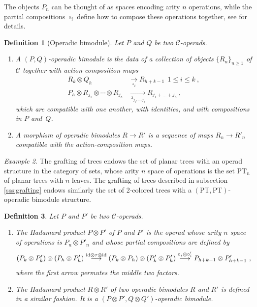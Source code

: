\documentclass[twoside, 12pt]{amsart}
\newtheorem{definition}{Definition}[section]
\theoremstyle{remark}
\newtheorem{example}[definition]{\sc Example}
\begin{document}
The objects $P_n$ can be thought of as spaces encoding arity $n$ operations, while the partial compositions $\circ_i$ define how to compose these operations together, see \cite[Chapter 5]{LodayVallette12} for details. 

\begin{definition}[Operadic bimodule] Let $P$ and $Q$ be two $\mathcal{C}$-operads.
\begin{enumerate}[leftmargin=*]
\item A \emph{$(P,Q)$-operadic bimodule} is the data of a collection of objects $\{ R_n \}_{n \geqslant 1}$ of $\mathcal{C}$ together with \emph{action-composition maps}
\begin{align*}
R_k \otimes Q_h &\underset{\circ_i}{\longrightarrow} R_{h+k-1} \ \ 1 \leqslant i \leqslant k \ ,  \\
P_h \otimes R_{j_1} \otimes \cdots \otimes R_{j_h} &\underset{\lambda_{j_1,\dots,j_h}}{\longrightarrow} R_{j_1 + \dots + j_h} \ ,
\end{align*}
which are compatible with one another, with identities, and with compositions in $P$ and~$Q$. 
\item A \emph{morphism of operadic bimodules} $R \rightarrow R'$ is a sequence of maps $R_n \rightarrow R'_n$ compatible with the action-composition maps.
\end{enumerate}
\end{definition}

\begin{example}
The grafting of trees endows the set of planar trees with an operad structure in the category of sets, whose arity $n$ space of operations is the set $\mathrm{PT}_n$ of planar trees with $n$ leaves. 
The grafting of trees described in subsection \ref{sss:grafting} endows similarly the set of 2-colored trees with a $(\mathrm{PT},\mathrm{PT})$-operadic bimodule structure. 
\end{example}

\begin{definition} \label{def:hadamard-product} Let $P$ and $P'$ be two $\mathcal{C}$-operads.
\begin{enumerate}[leftmargin=*]
    \item The \emph{Hadamard product} $P \otimes P'$ of $P$ and $P'$ is the operad whose arity $n$ space of operations is $P_n \otimes P'_n$ and whose partial compositions are defined by
    \[ (P_k \otimes P'_k) \otimes (P_h \otimes P'_h) \overset{\mathrm{id} \otimes \tau \otimes \mathrm{id}}{\longrightarrow} (P_k \otimes P_h) \otimes (P'_k \otimes P'_h) \overset{\circ_i \otimes \circ_i'}{\longrightarrow} P_{h+k-1} \otimes P'_{h+k-1} \ , \]
    where the first arrow permutes the middle two factors.
    \item The \emph{Hadamard product} $R \otimes R'$ of two operadic bimodules $R$ and $R'$ is defined in a similar fashion. It is a $(P \otimes P' , Q \otimes Q')$-operadic bimodule.
\end{enumerate}
\end{definition}
\end{document}

